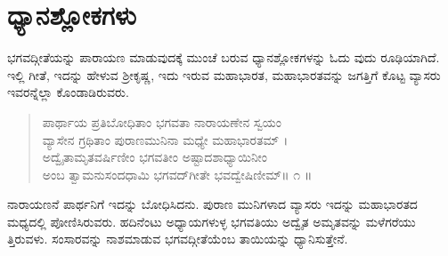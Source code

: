 
\chapter*{ಧ್ಯಾನಶ್ಲೋಕಗಳು}

ಭಗವದ್ಗೀತೆಯನ್ನು ಪಾರಾಯಣ ಮಾಡುವುದಕ್ಕೆ ಮುಂಚೆ ಬರುವ ಧ್ಯಾನಶ್ಲೋಕಗಳನ್ನು ಓದು ವುದು ರೂಢಿಯಾಗಿದೆ. ಇಲ್ಲಿ ಗೀತೆ, ಇದನ್ನು ಹೇಳುವ ಶ್ರೀಕೃಷ್ಣ, ಇದು ಇರುವ ಮಹಾಭಾರತ, ಮಹಾಭಾರತವನ್ನು ಜಗತ್ತಿಗೆ ಕೊಟ್ಟ ವ್ಯಾಸರು ಇವರನ್ನೆಲ್ಲಾ ಕೊಂಡಾಡಿರುವರು.

\begin{verse}
ಪಾರ್ಥಾಯ ಪ್ರತಿಬೋಧಿತಾಂ ಭಗವತಾ ನಾರಾಯಣೇನ ಸ್ವಯಂ\\ವ್ಯಾಸೇನ ಗ್ರಥಿತಾಂ ಪುರಾಣಮುನಿನಾ ಮಧ್ಯೇ ಮಹಾಭಾರತಮ್ ।\\ಅದ್ವೈತಾಮೃತವರ್ಷಿಣೀಂ ಭಗವತೀಂ ಅಷ್ಟಾದಶಾಧ್ಯಾಯಿನೀಂ\\ಅಂಬ ತ್ವಾಮನುಸಂದಧಾಮಿ ಭಗವದ್​ಗೀತೇ ಭವದ್ವೇಷಿಣೀಮ್\num{॥ ೧ ॥}
\end{verse}

{\small ನಾರಾಯಣನೆ ಪಾರ್ಥನಿಗೆ ಇದನ್ನು ಬೋಧಿಸಿದನು. ಪುರಾಣ ಮುನಿಗಳಾದ ವ್ಯಾಸರು ಇದನ್ನು ಮಹಾಭಾರತದ ಮಧ್ಯದಲ್ಲಿ ಪೋಣಿಸಿರುವರು. ಹದಿನೆಂಟು ಅಧ್ಯಾಯಗಳುಳ್ಳ ಭಗವತಿಯು ಅದ್ವೈತ ಅಮೃತವನ್ನು ಮಳೆಗರೆಯು ತ್ತಿರುವಳು. ಸಂಸಾರವನ್ನು ನಾಶಮಾಡುವ ಭಗವದ್ಗೀತೆಯೆಂಬ ತಾಯಿಯನ್ನು ಧ್ಯಾನಿಸುತ್ತೇನೆ.}

